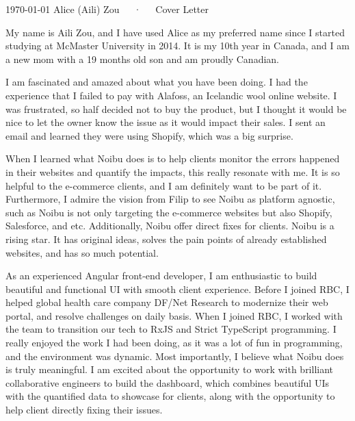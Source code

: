 \documentclass[11pt, a4paper]{awesome-cv}
\begin{document}
\makecvheader[R]

\makecvfooter
  {\today}
  {Alice (Aili) Zou~~~·~~~Cover Letter}
  {}

\makelettertitle

\begin{cvletter}

My name is Aili Zou, and I have used Alice as my preferred name since I started studying at McMaster University in 2014. It is my 10th year in Canada, and I am a new mom with a 19 months old son and am proudly Canadian.

I am fascinated and amazed about what you have been doing. I had the experience that I failed to pay with Alafoss, an Icelandic wool online website. I was frustrated, so half decided not to buy the product, but I thought it would be nice to let the owner know the issue as it would impact their sales. I sent an email and learned they were using Shopify, which was a big surprise. 

When I learned what Noibu does is to help clients monitor the errors happened in their websites and quantify the impacts, this really resonate with me. It is so helpful to the e-commerce clients, and I am definitely want to be part of it. Furthermore, I admire the vision from Filip to see Noibu as platform agnostic, such as Noibu is not only targeting the e-commerce websites but also Shopify, Salesforce, and etc. Additionally, Noibu offer direct fixes for clients. Noibu is a rising star. It has original ideas, solves the pain points of already established websites, and has so much potential. 

As an experienced Angular front‑end developer, I am enthusiastic to build beautiful and functional UI with smooth client experience. Before I joined RBC, I helped global health care company DF/Net Research to modernize their web portal, and resolve challenges on daily basis. When I joined RBC, I worked with the team to transition our tech to RxJS and Strict TypeScript programming. I really enjoyed the work I had been doing, as it was a lot of fun in programming, and the environment was dynamic. Most importantly, I believe what Noibu does is truly meaningful. I am excited about the opportunity to work with brilliant collaborative engineers to build the dashboard, which combines beautiful UIs  with the quantified data to showcase for clients, along with the opportunity to help client directly fixing their issues.


\end{cvletter}
\end{document}
